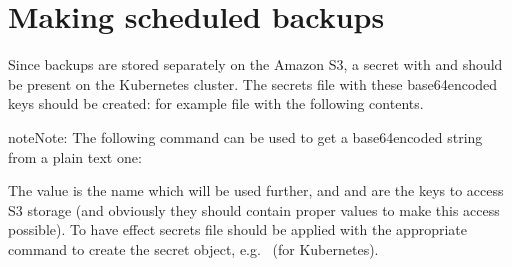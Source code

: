 \documentclass[letterpaper,10pt,english]{sphinxmanual}
\begin{document}
\section{Making scheduled backups}
\label{\detokenize{backups:making-scheduled-backups}}\label{\detokenize{backups:backups-scheduled}}
Since backups are stored separately on the Amazon S3, a secret with
 and  should be present on
the Kubernetes cluster. The secrets file with these base64\sphinxhyphen{}encoded keys should
be created: for example  file with the following
contents.

\begin{sphinxVerbatim}[commandchars=\\\{\}]
 
 
   
 
   
   
\end{sphinxVerbatim}

\begin{sphinxadmonition}{note}{Note:}
The following command can be used to get a base64\sphinxhyphen{}encoded string from
a plain text one: 
\end{sphinxadmonition}

The  value is the 
name which will be used further, and  and
 are the keys to access S3 storage (and
obviously they should contain proper values to make this access
possible). To have effect secrets file should be applied with the
appropriate command to create the secret object,
e.g.  (for Kubernetes).
\end{document}
